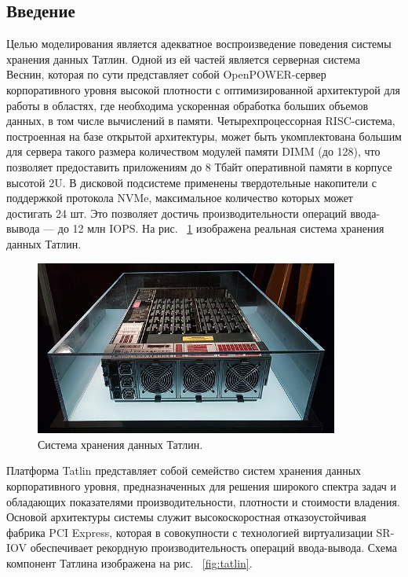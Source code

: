 \subsection{Введение}
\par 
Целью моделирования является адекватное воспроизведение поведения системы хранения данных Татлин. Одной из ей частей является серверная система Веснин, которая по сути представляет собой OpenPOWER-сервер корпоративного уровня высокой плотности с оптимизированной архитектурой для работы в областях, где необходима ускоренная обработка больших объемов данных, в том числе вычислений в памяти. Четырехпроцессорная RISC-система, построенная на базе открытой архитектуры, может быть укомплектована большим для сервера такого размера количеством модулей памяти DIMM (до 128), что позволяет предоставить приложениям до 8 Тбайт оперативной памяти в корпусе высотой 2U. В дисковой подсистеме применены твердотельные накопители с поддержкой протокола NVMe, максимальное количество которых может достигать 24 шт. Это позволяет достичь производительности операций ввода-вывода — до 12 млн IOPS. На рис. ~\ref{fig:yadro-tatlin} изображена реальная система хранения данных Татлин.

\begin{figure}[!ht]
\centering
\includegraphics[width=10cm]{Kenenbek/images/yadro-tatlin.jpg}
\caption{Система хранения данных Татлин.}
\label{fig:yadro-tatlin}
\end{figure}

\par 
Платформа Tatlin представляет собой семейство систем хранения данных корпоративного уровня, предназначенных для решения широкого спектра задач и обладающих показателями производительности, плотности и стоимости владения. Основой архитектуры системы служит высокоскоростная отказоустойчивая фабрика PCI Express, которая в совокупности с технологией виртуализации SR-IOV обеспечивает рекордную производительность операций ввода-вывода. Схема компонент Татлина изображена на рис. ~\ref{fig:tatlin}.

